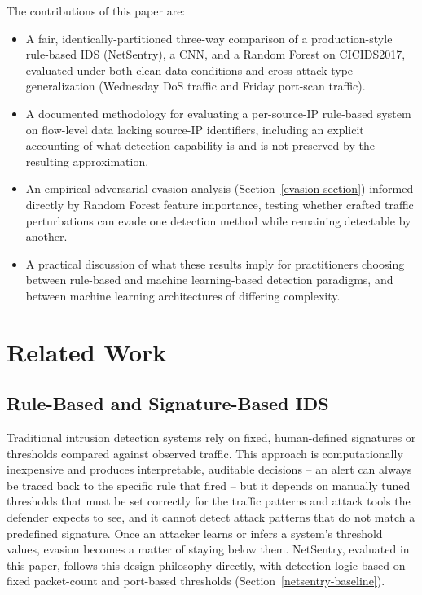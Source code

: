 \documentclass[conference]{IEEEtran}
\begin{document}
The contributions of this paper are:
\begin{itemize}
\item A fair, identically-partitioned three-way comparison of a production-style rule-based IDS (NetSentry), a CNN, and a Random Forest on CICIDS2017, evaluated under both clean-data conditions and cross-attack-type generalization (Wednesday DoS traffic and Friday port-scan traffic).
\item A documented methodology for evaluating a per-source-IP rule-based system on flow-level data lacking source-IP identifiers, including an explicit accounting of what detection capability is and is not preserved by the resulting approximation.
\item An empirical adversarial evasion analysis (Section~\ref{evasion-section}) informed directly by Random Forest feature importance, testing whether crafted traffic perturbations can evade one detection method while remaining detectable by another.
\item A practical discussion of what these results imply for practitioners choosing between rule-based and machine learning-based detection paradigms, and between machine learning architectures of differing complexity.
\end{itemize}
 
\section{Related Work}
\subsection{Rule-Based and Signature-Based IDS}
 
Traditional intrusion detection systems rely on fixed, human-defined signatures or thresholds compared against observed traffic. This approach is computationally inexpensive and produces interpretable, auditable decisions -- an alert can always be traced back to the specific rule that fired -- but it depends on manually tuned thresholds that must be set correctly for the traffic patterns and attack tools the defender expects to see, and it cannot detect attack patterns that do not match a predefined signature. Once an attacker learns or infers a system's threshold values, evasion becomes a matter of staying below them. NetSentry, evaluated in this paper, follows this design philosophy directly, with detection logic based on fixed packet-count and port-based thresholds (Section~\ref{netsentry-baseline}).
 
\end{document}
